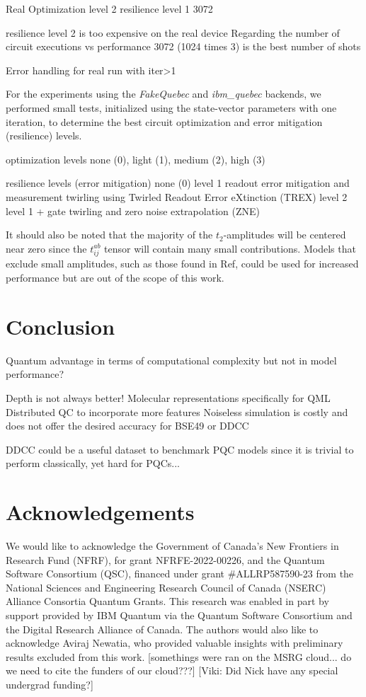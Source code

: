 \documentclass[journal=jacsat,manuscript=article]{achemso}
\begin{document}
Real
Optimization level 2 
resilience level 1
3072

resilience level 2 is too expensive on the real device
Regarding the number of circuit executions vs performance 3072 (1024 times 3) is the best number of shots

Error handling for real run with iter>1

For the experiments using the \textit{FakeQuebec} and \textit{ibm\_quebec} backends, we performed small tests, initialized using the state-vector parameters with one iteration, to determine the best circuit optimization and error mitigation (resilience) levels. 

optimization levels
none (0), light (1), medium (2), high (3)


resilience levels (error mitigation)
none (0) 
level 1 readout error mitigation and measurement twirling using Twirled Readout Error eXtinction (TREX) \cite{van_den_berg_model-free_2022}
level 2 level 1 + gate twirling and zero noise extrapolation (ZNE)\cite{kandala_error_2019,li_efficient_2017,temme_error_2017}



It should also be noted that the majority of the $t_{2}$-amplitudes will be centered near zero since the $t^{ab}_{ij}$ tensor will contain many small contributions.
Models that exclude small amplitudes, such as those found in Ref\cite{pathirage_exploration_2024}, could be used for increased performance but are out of the scope of this work.

\section{Conclusion}
Quantum advantage in terms of computational complexity but not in model performance?


Depth is not always better!
Molecular representations specifically for QML
Distributed QC to incorporate more features
Noiseless simulation is costly and does not offer the desired accuracy for BSE49 or DDCC

DDCC could be a useful dataset to benchmark PQC models since it is trivial to perform classically, yet hard for PQCs...




\section{Acknowledgements}
We would like to acknowledge the Government of Canada’s New Frontiers in Research Fund (NFRF), for grant NFRFE-2022-00226, and the Quantum Software Consortium (QSC), financed under grant \#ALLRP587590-23 from the National Sciences and Engineering Research Council of Canada (NSERC) Alliance Consortia Quantum Grants.
This research was enabled in part by support provided by IBM Quantum via the Quantum Software Consortium and the Digital Research Alliance of Canada.
The authors would also like to acknowledge Aviraj Newatia, who provided valuable insights with preliminary results excluded from this work.
[somethings were ran on the MSRG cloud... do we need to cite the funders of our cloud???]
[Viki: Did Nick have any special undergrad funding?]


\end{document}
